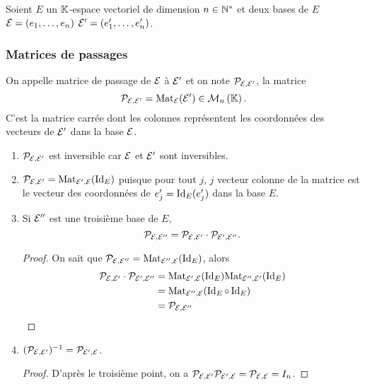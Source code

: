 Soient \(E\) un \(\K\)-espace vectoriel de dimension \(n \in \N^*\) et deux 
bases de \(E\) \(\E=(e_1, \ldots, e_n)\) \(\E'=(e'_1, \ldots, e'_n)\). 

\subsubsection{Matrices de passages}

\begin{defdef} On appelle matrice de passage de \(\E\) à \(\E'\) et on note 
  \(\P_{\E,\E'}\), la matrice
  \begin{equation}
    \P_{\E,\E'} = \Mat_\E(\E') \in \Mn{n}{\K}.
  \end{equation}
  C'est la matrice carrée dont les colonnes représentent les coordonnées des 
  vecteurs de \(\E'\) dans la base \(\E\).
\end{defdef}

\begin{prop}
  \begin{enumerate}
    \item \(\P_{\E,\E'}\) est inversible car \(\E\) et \(\E'\) sont 
      inversibles.
    \item \(\P_{\E,\E'} = \Mat_{\E',\E}(\Id_E)\) puisque pour tout \(j\), 
      \(j\)\ieme{} vecteur colonne de la matrice est le vecteur des 
      coordonnées de \(e'_j=\Id_E(e'_j)\) dans la base \(E\).
    \item Si \(\E''\) est une troisième base de \(E\),
      \begin{equation}
        \P_{\E,\E''}=\P_{\E,\E'} \cdot \P_{\E',\E''}.
      \end{equation}
      \begin{proof}
        On sait que \(\P_{\E,\E''} = \Mat_{\E'',\E}(\Id_E)\), alors
        \begin{align*}
          \P_{\E,\E'} \cdot \P_{\E',\E''} &= \Mat_{\E',\E}(\Id_E) 
          \Mat_{\E'',\E'}(\Id_E) \\
          &= \Mat_{\E'',\E}(\Id_E \circ \Id_E) \\
          &=\P_{\E,\E''}
        \end{align*}
      \end{proof}
    \item \((\P_{\E,\E'})^{-1} = \P_{\E',\E}\).
      \begin{proof}
        D'après le troisième point, on a \(\P_{\E,\E'} 
        \P_{\E',\E}=\P_{\E,\E}=I_n\).
      \end{proof}
  \end{enumerate}
\end{prop}

